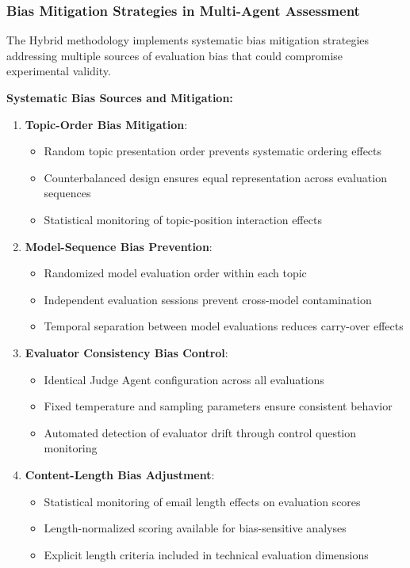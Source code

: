 \subsubsection{Bias Mitigation Strategies in Multi-Agent Assessment}

The Hybrid methodology implements systematic bias mitigation strategies addressing multiple sources of evaluation bias that could compromise experimental validity.

\textbf{Systematic Bias Sources and Mitigation:}

\begin{enumerate}
    \item \textbf{Topic-Order Bias Mitigation}:
    \begin{itemize}
        \item Random topic presentation order prevents systematic ordering effects
        \item Counterbalanced design ensures equal representation across evaluation sequences
        \item Statistical monitoring of topic-position interaction effects
    \end{itemize}
    
    \item \textbf{Model-Sequence Bias Prevention}:
    \begin{itemize}
        \item Randomized model evaluation order within each topic
        \item Independent evaluation sessions prevent cross-model contamination
        \item Temporal separation between model evaluations reduces carry-over effects
    \end{itemize}
    
    \item \textbf{Evaluator Consistency Bias Control}:
    \begin{itemize}
        \item Identical Judge Agent configuration across all evaluations
        \item Fixed temperature and sampling parameters ensure consistent behavior
        \item Automated detection of evaluator drift through control question monitoring
    \end{itemize}
    
    \item \textbf{Content-Length Bias Adjustment}:
    \begin{itemize}
        \item Statistical monitoring of email length effects on evaluation scores
        \item Length-normalized scoring available for bias-sensitive analyses
        \item Explicit length criteria included in technical evaluation dimensions
    \end{itemize}
\end{enumerate}

